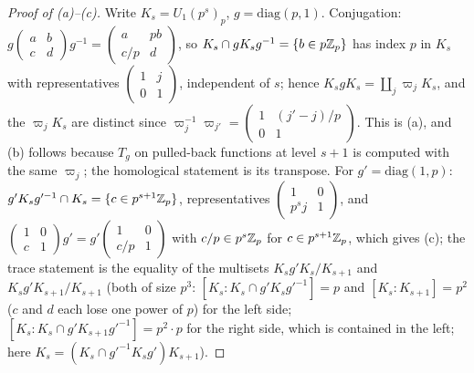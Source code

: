 \begin{proof}[Proof of (a)--(c)]
Write $K_s=U_1(p^s)_p$, $g=\mathrm{diag}(p,1)$. Conjugation: $g\left(\begin{smallmatrix}a&b\\c&d\end{smallmatrix}\right)g^{-1}=
\left(\begin{smallmatrix}a&pb\\c/p&d\end{smallmatrix}\right)$, so $K_s\cap gK_sg^{-1}=\{b\in p\mathbb{Z}_p\}$ has index $p$ in $K_s$ with
representatives $\left(\begin{smallmatrix}1&j\\0&1\end{smallmatrix}\right)$, independent of $s$; hence $K_sgK_s=\coprod_j\varpi_jK_s$, and
the $\varpi_j K_s$ are distinct since $\varpi_j^{-1}\varpi_{j'}=\left(\begin{smallmatrix}1&(j'-j)/p\\0&1\end{smallmatrix}\right)$. This is (a), and
(b) follows because $T_g$ on pulled-back functions at level $s+1$ is computed with the same $\varpi_j$; the homological
statement is its transpose. For $g'=\mathrm{diag}(1,p)$: $g'K_sg'^{-1}\cap K_s=\{c\in p^{s+1}\mathbb{Z}_p\}$, representatives
$\left(\begin{smallmatrix}1&0\\p^sj&1\end{smallmatrix}\right)$, and $\left(\begin{smallmatrix}1&0\\c&1\end{smallmatrix}\right)g'=g'\left(\begin{smallmatrix}1&0\\c/p&1\end{smallmatrix}\right)$ with
$c/p\in p^{s}\mathbb{Z}_p$ for $c\in p^{s+1}\mathbb{Z}_p$, which gives (c); the trace statement is the equality of the multisets
$K_sg'K_s/K_{s+1}$ and $K_sg'K_{s+1}/K_{s+1}$ (both of size $p^3$: $[K_s:K_s\cap g'K_sg'^{-1}]=p$ and $[K_s:K_{s+1}]=p^2$ ($c$ and $d$ each lose one power of $p$) for the left side;
$[K_s:K_s\cap g'K_{s+1}g'^{-1}]=p^2\cdot p$ for the right side, which is contained in the left; here $K_s=(K_s\cap g'^{-1}K_sg')K_{s+1}$).
\end{proof}

